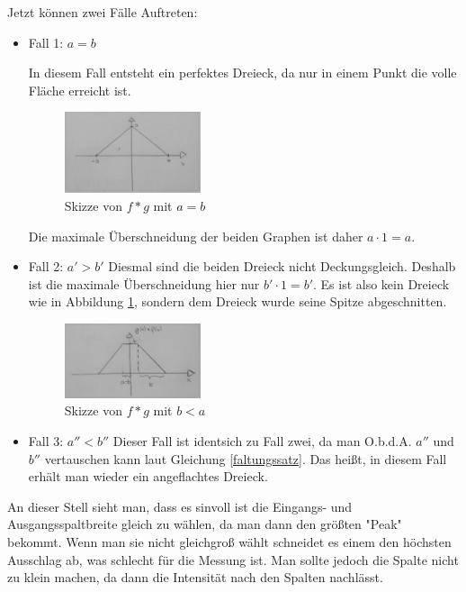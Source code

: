    Jetzt können zwei Fälle Auftreten:\\
   \begin{itemize}
       \item Fall 1: $a=b$
 
            In diesem Fall entsteht ein perfektes Dreieck, da nur in einem Punkt die volle Fläche erreicht ist.
            \begin{figure}[h]
                \centering
                \includegraphics[width = 4cm]{Bilder/FzV/frage6_3.jpg}
                \caption{Skizze von $f \ast g$ mit $a=b$}
                \label{faltung}
            \end{figure}
        Die maximale Überschneidung der beiden Graphen ist daher $a \cdot 1 = a$.
       \item Fall 2: $a'  > b'$
            Diesmal sind die beiden Dreieck nicht Deckungsgleich. Deshalb ist die maximale Überschneidung hier nur $b' \cdot 1 = b'$. 
            Es ist also kein Dreieck wie in Abbildung \ref{faltung}, sondern dem Dreieck wurde seine Spitze abgeschnitten. 
            \newpage
            \begin{figure}[h]
                \centering
                \includegraphics[width = 4cm]{Bilder/FzV/frage6_4.jpg}
                \caption{Skizze von $f\ast g$ mit $b < a$}
            \end{figure}
        \item Fall 3: $a''< b''$
            Dieser Fall ist identsich zu Fall zwei, da man O.b.d.A. $a''$ und $b''$ vertauschen kann laut Gleichung \ref{faltungssatz}.
            Das heißt, in diesem Fall erhält man wieder ein angeflachtes Dreieck.
   \end{itemize}
An dieser Stell sieht man, dass es sinvoll ist die Eingangs- und Ausgangsspaltbreite gleich zu wählen, da man dann den größten "Peak" bekommt. 
Wenn man sie nicht gleichgroß wählt schneidet es einem den höchsten Ausschlag ab, was schlecht für die Messung ist. Man sollte jedoch die Spalte nicht zu klein machen, da dann die Intensität nach den Spalten nachlässt. 

